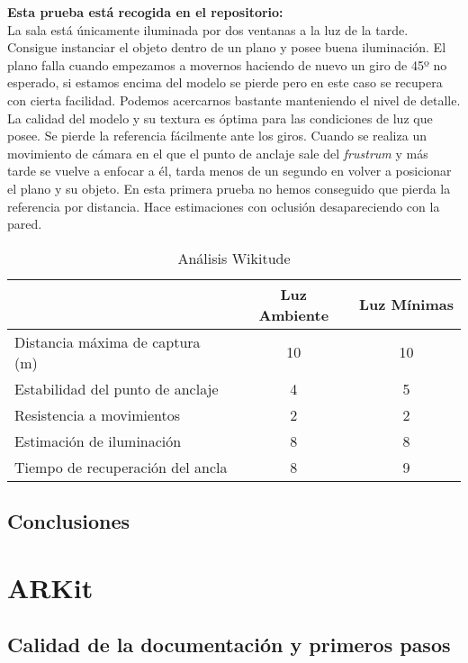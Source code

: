 \textbf{Esta prueba está recogida en el repositorio:}\\

La sala está únicamente iluminada por dos ventanas a la luz de la tarde.\\

Consigue instanciar el objeto dentro de un plano y posee buena iluminación. El plano falla cuando empezamos a movernos haciendo de nuevo un giro de 45º no esperado, si estamos encima del modelo se pierde pero en este caso se recupera con cierta facilidad. Podemos acercarnos bastante manteniendo el nivel de detalle. La calidad del modelo y su textura es óptima para las condiciones de luz que posee. Se pierde la referencia fácilmente ante los giros. Cuando se realiza un movimiento de cámara en el que el punto de anclaje sale del \textit{frustrum} y más tarde se vuelve a enfocar a él, tarda menos de un segundo en volver a posicionar el plano y su objeto. En esta primera prueba no hemos conseguido que pierda la referencia por distancia. Hace estimaciones con oclusión desapareciendo con la pared.

\begin{table}[H]
    \centering
    \begin{tabular}{|l|c|c|}
    \hline
          & Luz Ambiente & Luz Mínimas \\
         \hline
        Distancia máxima de captura (m)  & 10&10\\
        \hline
        Estabilidad del punto de anclaje  & 4&5\\
        \hline
        Resistencia a movimientos  & 2&2 \\
        \hline
        Estimación de iluminación  & 8&8 \\
        \hline
        Tiempo de recuperación del ancla  & 8&9 \\
      \hline
    \end{tabular}
    \caption{Análisis Wikitude}
    \label{tab:TWikitude}
\end{table}

\subsection{Conclusiones}

\clearpage
\section{ARKit}
\subsection{Calidad de la documentación y primeros pasos}

